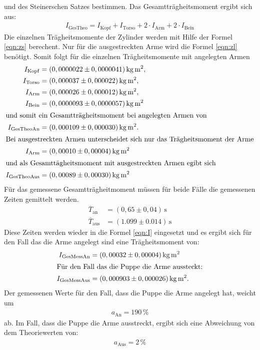 und des Steinerschen Satzes bestimmen. Das Gesamtträgheitsmoment ergibt sich aus:
\begin{align}
  I_\mathrm{GesTheo}=I_\mathrm{Kopf}+I_\mathrm{Torso}+2\cdot I_\mathrm{Arm}+2\cdot I_\mathrm{Bein}
\end{align}
Die einzelnen Trägheitsmomente der Zylinder werden
mit Hilfe der Formel \eqref{eqn:zs} berechent.
Nur für die ausgestreckten Arme wird
die Formel \eqref{eqn:zl} benötigt.
Somit folgt für die einzelnen Trägheitsmomente mit angelegten Armen
\begin{align*}
I_\mathrm{Kopf} &=(0,0000022\pm0,0000041)\,\si{\kilo\gram\meter\squared},\\
I_\mathrm{Torso}&=(0,000037\pm0,000022)\,\si{\kilo\gram\meter\squared},\\
I_\mathrm{Arm}  &=(0,000026\pm0,000012)\,\si{\kilo\gram\meter\squared},\\
I_\mathrm{Bein} &=(0,0000093\pm0,0000057)\,\si{\kilo\gram\meter\squared}\\
\intertext{und somit ein Gesamtträgheitsmoment bei angelegten Armen von}
I_\mathrm{GesTheoAn}&=(0,000109\pm0,000030)\,\si{\kilo\gram\meter\squared}.\\
\intertext{Bei ausgestreckten Armen unterscheidet sich nur das Trägheitsmoment der Arme}
I_\mathrm{Arm}&=(0,00010\pm0,00004)\,\si{\kilo\gram\meter\squared}\\
\intertext{und als Gesamttägheitsmoment mit ausgestreckten Armen egibt sich}
I_\mathrm{GesTheoAus}&=(0,00089\pm0,00030)\,\si{\kilo\gram\meter\squared}\\
\end{align*}
Für das gemessene Gesamtträgheitmoment
müssen für beide Fälle
die gemessenen Zeiten gemittelt werden.
\begin{align*}
\overline{T}_\mathrm{an} &=(0,65\pm0,04)\,\si{\second}\\
\overline{T}_\mathrm{aus}&=(1.099\pm0.014)\,\si{\second}
\end{align*}
Diese Zeiten werden wieder in die Formel \eqref{eqn:I}
eingesetzt und es ergibt sich für den Fall das
die Arme angelegt sind eine Trägheitsmoment von:
\begin{align*}
I_\mathrm{GesMessAn}&=(0,00032\pm0,00004)\,\si{\kilo\gram\meter\squared}\\
\intertext{Für den Fall das die Puppe die Arme aussteckt:}
I_\mathrm{GesMessAus}&= (0,000903\pm0,000026)\,\si{\kilo\gram\meter\squared}.\\
\end{align*}
Der gemessenen Werte für den Fall, dass die Puppe die Arme angelegt hat,
weicht um
\begin{align*}
  a_\mathrm{An}=190\,\si{\percent}
\end{align*}
ab. Im Fall, dass die Puppe die Arme ausstreckt, ergibt sich
eine Abweichung von dem Theoriewerten von:
\begin{align*}
  a_\mathrm{Aus}=2\,\si{\percent}
\end{align*}
